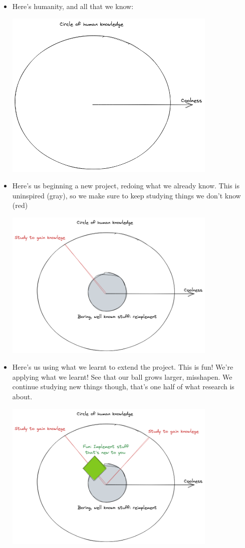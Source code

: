 \documentclass{article}
\begin{document}
\begin{itemize}
\item Here's humanity, and all that we know:

\includegraphics[width=0.8\textwidth]{./images/research-0.png}

\item Here's us beginning a new project, redoing what we already know. This is uninspired (gray),
  so we make sure to keep studying things we don't know (red)

\includegraphics[width=0.8\textwidth]{./images/research-1.png}

\newpage

\item Here's us using what we learnt to extend the project. This is fun! We're applying what we learnt! See
  that our ball grows larger, misshapen. We continue studying new things though, that's one half of 
  what research is about.

\includegraphics[width=0.8\textwidth]{./images/research-3.png}


\end{itemize}
\end{document}
